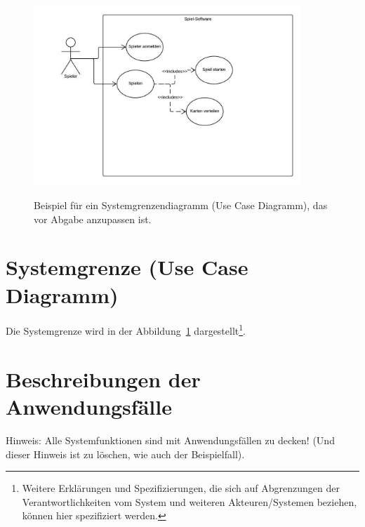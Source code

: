 \begin{figure}
\centering	
\includegraphics[width=0.9\textwidth]{img/ucd.jpg}
\label{fig:sys}
\caption{Beispiel für ein Systemgrenzendiagramm (Use Case Diagramm), das vor Abgabe anzupassen ist.}
\end{figure}

\section{Systemgrenze (Use Case Diagramm)}

Die Systemgrenze wird in der Abbildung~\ref{fig:sys} dargestellt\footnote{Weitere Erklärungen und Spezifizierungen, die sich auf Abgrenzungen der Verantwortlichkeiten vom System und weiteren Akteuren/Systemen beziehen, können hier spezifiziert werden.}. 


\section{Beschreibungen der Anwendungsfälle}

Hinweis: Alle Systemfunktionen sind mit Anwendungsfällen zu decken! (Und dieser Hinweis ist zu löschen, wie auch der Beispielfall).

\setcounter{uc}{10}

